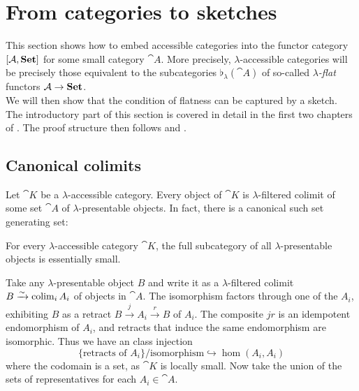 \section{From categories to sketches}
\label{seq:catstoskeches}

This section shows how to embed accessible categories into the functor category $[\mathcal{A},\mathbf{Set}]$ for some small category $\cat A$. More precisely, $\lambda$-accessible categories will be precisely those equivalent to the subcategories $\flat_\lambda(\cat A)$ of so-called \emph{$\lambda$-flat} functors $\mathcal{A} \to \mathbf{Set}$. \\

We will then show that the condition of flatness can be captured by a sketch. \\

The introductory part of this section is covered in detail in the first two chapters of \cite{AdamekRosicky}. The proof structure then follows \cite[Chapter 2]{MakkaiPare} and \cite[D2.3]{elephant}.

\subsection{Canonical colimits}

Let $\cat K$ be a $\lambda$-accessible category. Every object of $\cat K$ is $\lambda$-filtered colimit of some set $\cat A$ of $\lambda$-presentable objects. In fact, there is a canonical such set generating set:

\begin{Proposition}
For every $\lambda$-accessible category $\cat K$, the full subcategory of all $\lambda$-presentable objects is essentially small. 
\end{Proposition}
\begin{Proof}
Take any $\lambda$-presentable object $B$ and write it as a $\lambda$-filtered colimit $B \xrightarrow{\sim} \operatorname{colim}_i A_i$ of objects in $\cat A$. The isomorphism factors through one of the $A_i$, exhibiting $B$ as a retract $B \xrightarrow{j} A_i \xrightarrow{r} B$ of $A_i$. The composite $jr$ is an idempotent endomorphism of $A_i$, and retracts that induce the same endomorphism are isomorphic. Thus we have an class injection
\[ \{ \text{retracts of } A_i \}/\text{isomorphism} \hookrightarrow \hom(A_i,A_i) \]
where the codomain is a set, as $\cat K$ is locally small. Now take the union of the sets of representatives for each $A_i \in \cat A$.
\end{Proof}

